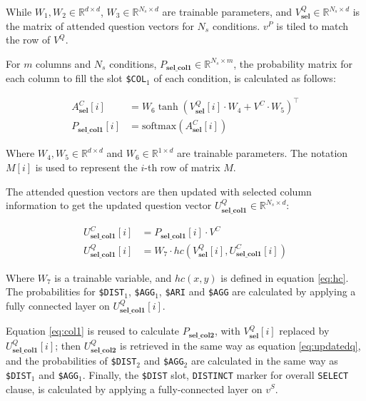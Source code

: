 \documentclass[11pt,a4paper]{article}
\begin{document}
While $W_1, W_2 \in \mathbb{R}^{d \times d}$, $W_3 \in \mathbb{R}^{N_s \times d }$ are trainable parameters, and $V_\textbf{sel}^Q \in \mathbb{R}^{N_s \times d}$ is the matrix of attended question vectors for $N_s$ conditions. $v^P$ is tiled to match the row of $V^Q$.

For $m$ columns and $N_s$ conditions, $P_\textbf{sel\_col1} \in \mathbb{R}^{N_s \times m}$, the probability matrix for each column to fill the slot \texttt{\$COL$_1$} of each condition, is calculated as follows:

\begin{align}
A^C_\textbf{sel}[i] &= W_6\tanh( V^Q_\textbf{sel}[i] \cdot W_4 + V^C \cdot W_5 )^\intercal  \nonumber \\
P_\textbf{sel\_col1}[i] &= \text{softmax}( A^C_\textbf{sel}[i] ) \label{eq:col1}
\end{align}

Where $W_4, W_5 \in \mathbb{R}^{d \times d}$ and $W_6 \in \mathbb{R}^{1 \times d}$ are trainable parameters. The notation $M[i]$ is used to represent the $i$-th row of matrix $M$.

The attended question vectors are then updated with selected column information to get the updated question vector  $U^Q_\textbf{sel\_col1} \in \mathbb{R}^{N_s \times d}$:

\begin{equation}
\begin{aligned}
U^C_\textbf{sel\_col1}[i] &= P_\textbf{sel\_col1}[i] \cdot V^C \\
U^Q_\textbf{sel\_col1}[i] &= W_7 \cdot hc( V^Q_\textbf{sel} [i], U^C_\textbf{sel\_col1}[i]  ) 
\end{aligned}
\label{eq:updatedq}
\end{equation}

Where $W_7$ is a trainable variable, and $hc(x,y)$ is defined in equation \ref{eq:hc}. The probabilities for \texttt{\$DIST$_1$}, \texttt{\$AGG$_1$}, \texttt{\$ARI} and \texttt{\$AGG} are calculated by applying a fully connected layer on $U^Q_\textbf{sel\_col1}[i]$.

Equation \ref{eq:col1} is reused to calculate $P_\textbf{sel\_col2}$, with $V^Q_\textbf{sel}[i]$ replaced by $U^Q_\textbf{sel\_col1}[i]$; then $U^Q_\textbf{sel\_col2}$ is retrieved in the same way as equation \ref{eq:updatedq}, and the probabilities of \texttt{\$DIST$_2$} and \texttt{\$AGG$_2$} are calculated in the same way as \texttt{\$DIST$_1$} and \texttt{\$AGG$_1$}. Finally, the \texttt{\$DIST} slot, \texttt{DISTINCT} marker for overall \texttt{SELECT} clause, is calculated by applying a fully-connected layer on $v^S$.
\end{document}
